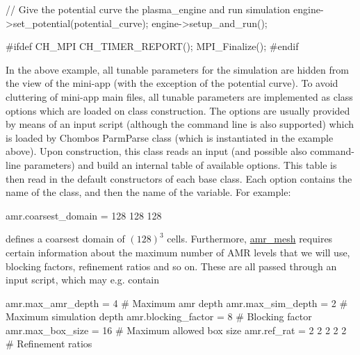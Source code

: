 \begin{DoxyVerb}
{    // Give the potential curve the plasma_engine and run simulation
    engine->set_potential(potential_curve);
    engine->setup_and_run();


  #ifdef CH_MPI
    CH_TIMER_REPORT();
    MPI_Finalize();
  #endif
  }
\end{DoxyVerb}


In the above example, all tunable parameters for the simulation are hidden from the view of the mini-\/app (with the exception of the potential curve). To avoid cluttering of mini-\/app main files, all tunable parameters are implemented as class options which are loaded on class construction. The options are usually provided by means of an input script (although the command line is also supported) which is loaded by Chombo\textquotesingle{}s Parm\+Parse class (which is instantiated in the example above). Upon construction, this class reads an input (and possible also command-\/line parameters) and build an internal table of available options. This table is then read in the default constructors of each base class. Each option contains the name of the class, and then the name of the variable. For example\+: \begin{DoxyVerb}  amr.coarsest_domain = 128 128 128
\end{DoxyVerb}


defines a coarsest domain of $(128)^3$ cells. Furthermore, \hyperlink{classamr__mesh}{amr\+\_\+mesh} requires certain information about the maximum number of A\+MR levels that we will use, blocking factors, refinement ratios and so on. These are all passed through an input script, which may e.\+g. contain \begin{DoxyVerb}  amr.max_amr_depth   = 4           # Maximum amr depth
  amr.max_sim_depth   = 2           # Maximum simulation depth
  amr.blocking_factor = 8           # Blocking factor
  amr.max_box_size    = 16          # Maximum allowed box size
  amr.ref_rat         = 2 2 2 2 2   # Refinement ratios
\end{DoxyVerb}


